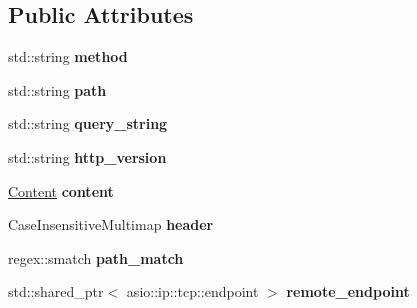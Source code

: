 \subsection*{Public Attributes}
\begin{DoxyCompactItemize}
\item 
std\+::string {\bfseries method}\hypertarget{classSimpleWeb_1_1ServerBase_1_1Request_a1fb7883b8e0e3a660117252f510f373c}{}\label{classSimpleWeb_1_1ServerBase_1_1Request_a1fb7883b8e0e3a660117252f510f373c}

\item 
std\+::string {\bfseries path}\hypertarget{classSimpleWeb_1_1ServerBase_1_1Request_aeb74bfe9b28c61dbf439f71ba752b0f7}{}\label{classSimpleWeb_1_1ServerBase_1_1Request_aeb74bfe9b28c61dbf439f71ba752b0f7}

\item 
std\+::string {\bfseries query\+\_\+string}\hypertarget{classSimpleWeb_1_1ServerBase_1_1Request_aac8edf618de88a2dc3edf5fafb351ab1}{}\label{classSimpleWeb_1_1ServerBase_1_1Request_aac8edf618de88a2dc3edf5fafb351ab1}

\item 
std\+::string {\bfseries http\+\_\+version}\hypertarget{classSimpleWeb_1_1ServerBase_1_1Request_a09d25275bf1442fb384bad9be714e6ba}{}\label{classSimpleWeb_1_1ServerBase_1_1Request_a09d25275bf1442fb384bad9be714e6ba}

\item 
\hyperlink{classSimpleWeb_1_1ServerBase_1_1Content}{Content} {\bfseries content}\hypertarget{classSimpleWeb_1_1ServerBase_1_1Request_aa62ad9907bb75bb1da861167134f772e}{}\label{classSimpleWeb_1_1ServerBase_1_1Request_aa62ad9907bb75bb1da861167134f772e}

\item 
Case\+Insensitive\+Multimap {\bfseries header}\hypertarget{classSimpleWeb_1_1ServerBase_1_1Request_a15c262f2775362b45f000ede9b7b16cb}{}\label{classSimpleWeb_1_1ServerBase_1_1Request_a15c262f2775362b45f000ede9b7b16cb}

\item 
regex\+::smatch {\bfseries path\+\_\+match}\hypertarget{classSimpleWeb_1_1ServerBase_1_1Request_acb4f07bffa4a0b92ebb451617c0c4752}{}\label{classSimpleWeb_1_1ServerBase_1_1Request_acb4f07bffa4a0b92ebb451617c0c4752}

\item 
std\+::shared\+\_\+ptr$<$ asio\+::ip\+::tcp\+::endpoint $>$ {\bfseries remote\+\_\+endpoint}\hypertarget{classSimpleWeb_1_1ServerBase_1_1Request_af917db214fc8f6c758aaaff50daff3ac}{}\label{classSimpleWeb_1_1ServerBase_1_1Request_af917db214fc8f6c758aaaff50daff3ac}


\end{DoxyCompactItemize}
